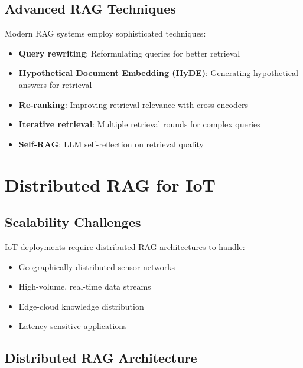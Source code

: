 \documentclass[12pt,a4paper]{article}
\begin{document}
\subsection{Advanced RAG Techniques}

Modern RAG systems employ sophisticated techniques:
\begin{itemize}
    \item \textbf{Query rewriting}: Reformulating queries for better retrieval
    \item \textbf{Hypothetical Document Embedding (HyDE)}: Generating hypothetical answers for retrieval
    \item \textbf{Re-ranking}: Improving retrieval relevance with cross-encoders
    \item \textbf{Iterative retrieval}: Multiple retrieval rounds for complex queries
    \item \textbf{Self-RAG}: LLM self-reflection on retrieval quality
\end{itemize}

\section{Distributed RAG for IoT}

\subsection{Scalability Challenges}

IoT deployments require distributed RAG architectures to handle:
\begin{itemize}
    \item Geographically distributed sensor networks
    \item High-volume, real-time data streams
    \item Edge-cloud knowledge distribution
    \item Latency-sensitive applications
\end{itemize}

\subsection{Distributed RAG Architecture}
\end{document}
